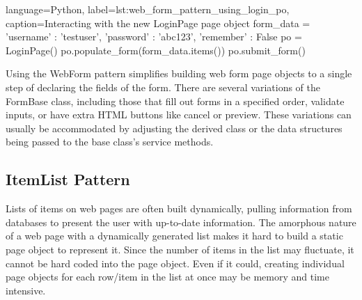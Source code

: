 \begin{xcode}{%
  language=Python,%
  label=lst:web_form_pattern_using_login_po,%
  caption={Interacting with the new LoginPage page object}%
}
form_data = {'username' : 'testuser',
             'password' : 'abc123',
             'remember' : False}
po = LoginPage()
po.populate_form(form_data.items())
po.submit_form()
\end{xcode}

Using the WebForm pattern simplifies building web form page objects to a single
step of declaring the fields of the form. There are several variations of the
FormBase class, including those that fill out forms in a specified order,
validate inputs, or have extra HTML buttons like cancel or preview. These
variations can usually be accommodated by adjusting the derived class or the
data structures being passed to the base class's service methods.


\subsection{ItemList Pattern}
\label{ssec:itemlist_pattern}

%
%
%
%
%

%
%



Lists of items on web pages are often built dynamically, pulling information
from databases to present the user with up-to-date information. The
amorphous nature of a web page with a dynamically generated list makes it hard to
build a static page object to represent it. Since the number of items in the
list may fluctuate, it cannot be hard coded into the page object.  Even if it
could, creating individual page objects for each row/item in the list at once
may be memory and time intensive.

